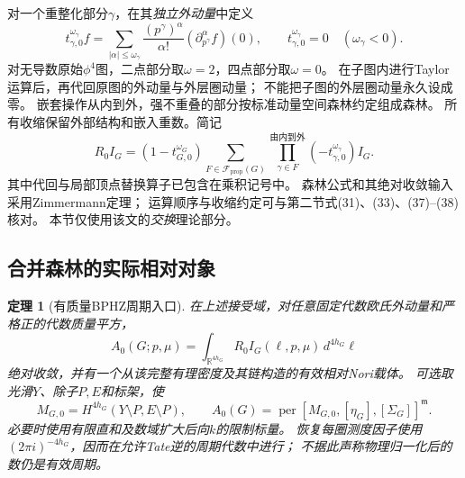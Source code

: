 \documentclass[11pt,a4paper]{ctexart}
\theoremstyle{cnplain}\newtheorem{theorem}{定理}[section]
\theoremstyle{definition}\newtheorem{definition}[theorem]{定义}
\theoremstyle{remark}\newtheorem{remark}[theorem]{注}
\begin{document}
对一个重整化部分$\gamma$，在其\emph{独立外动量}中定义
\begin{equation}
 t^{\omega_\gamma}_{\gamma,0}f
 =\sum_{|\alpha|\leq\omega_\gamma}
 \frac{(p^\gamma)^\alpha}{\alpha!}
 (\partial_{p^\gamma}^\alpha f)(0),
 \qquad t^{\omega_\gamma}_{\gamma,0}=0\quad(\omega_\gamma<0).
 \label{eq:massive-taylor}
\end{equation}
对无导数原始$\phi^4$图，二点部分取$\omega=2$，四点部分取$\omega=0$。
在子图内进行Taylor运算后，再代回原图的外动量与外层圈动量；
不能把子图的外层圈动量永久设成零。
嵌套操作从内到外，强不重叠的部分按标准动量空间森林约定组成森林。
所有收缩保留外部结构和嵌入重数。简记
\begin{equation}
 R_0 I_G=(1-t^{\omega_G}_{G,0})
 \sum_{F\in\mathcal F_{\mathrm{prop}}(G)}
 \prod_{\gamma\in F}^{\text{由内到外}}
 (-t^{\omega_\gamma}_{\gamma,0})I_G .
 \label{eq:massive-full-forest}
\end{equation}
其中代回与局部顶点替换算子已包含在乘积记号中。
森林公式和其绝对收敛输入采用Zimmermann定理\cite{ZimMass}；
运算顺序与收缩约定可与\cite{BGHMass}第二节式(31)、(33)、(37)--(38)核对。
本节仅使用该文的\emph{交换}理论部分。

\subsection{合并森林的实际相对对象}

\begin{theorem}[有质量BPHZ周期入口]
\label{thm:massive-period-entry}
在上述接受域，对任意固定代数欧氏外动量和严格正的代数质量平方，
\begin{equation}
 A_0(G;p,\mu)=\int_{\mathbb R^{4h_G}}
 R_0I_G(\ell,p,\mu)\,d^{4h_G}\ell
 \label{eq:massive-ren-period}
\end{equation}
绝对收敛，并有一个从该\emph{完整有理密度及其链}构造的有效相对Nori载体。
可选取光滑$Y$、除子$P,E$和标架，使
\begin{equation}
 M_{G,0}=H^{4h_G}(Y\setminus P,E\setminus P),\qquad
 A_0(G)=\operatorname{per}[M_{G,0},[\eta_G],[\Sigma_G]]^{\mathfrak m}.
 \label{eq:massive-relative-carrier}
\end{equation}
必要时使用有限直和及数域扩大后向$k$的限制标量。
恢复每圈测度因子使用$(2\pi i)^{-4h_G}$，因而在允许Tate逆的周期代数中进行；
不据此声称物理归一化后的数仍是\emph{有效}周期。
\end{theorem}
\end{document}
